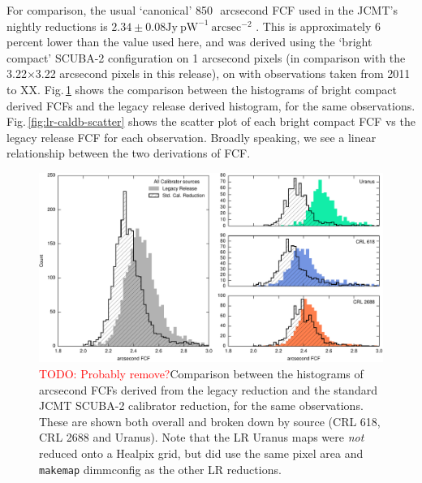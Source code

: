 \documentclass[twocolumn]{aastex6}
\newcommand{\todo}[1]{\textcolor{red}{TODO: #1}}
\begin{document}
For comparison, the usual `canonical' 850\,\micron\ arcsecond FCF used
in the JCMT's nightly reductions is $2.34 \pm 0.08 \mathrm{Jy}\
\mathrm{pW}^{-1}\ \mathrm{arcsec}^{-2}$ \citep{Dempsey2013}. This is
approximately 6 percent lower than the value used here, and was
derived using the `bright compact' SCUBA-2 configuration on 1
arcsecond pixels (in comparison with the 3.22$\times$3.22 arcsecond
pixels in this release), on with observations taken from 2011 to
XX. Fig.\,\ref{fig:lr-caldb-histo} shows the comparison between the
histograms of bright compact derived FCFs and the legacy release
derived histogram, for the same
observations. Fig.\,\ref{fig:lr-caldb-scatter} shows the scatter plot
of each bright compact FCF vs the legacy release FCF for each
observation. Broadly speaking, we see a linear relationship between
the two derivations of FCF.
\begin{figure}
\includegraphics{legacyFCF-caldbFCF-histograms.pdf}
\caption{\todo{Probably remove?}Comparison between the histograms of
  arcsecond FCFs derived from the legacy reduction and the standard
  JCMT SCUBA-2 calibrator reduction, for the same observations.
  These are shown both overall and broken down by source (CRL 618,
  CRL 2688 and Uranus). Note that the LR Uranus maps were \emph{not}
  reduced onto a Healpix grid, but did use the same pixel area and
  \texttt{makemap} dimmconfig as the other LR reductions.\label{fig:lr-caldb-histo}}
\end{figure}
\end{document}
